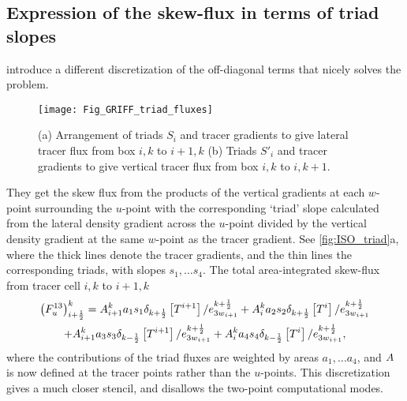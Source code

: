 \documentclass[../tex_main/NEMO_manual]{subfiles}
\begin{document}
\subsection{Expression of the skew-flux in terms of triad slopes}
\citep{Griffies_al_JPO98} introduce a different discretization of the off-diagonal terms that
nicely solves the problem.
\begin{figure}[tb] \begin{center}
    \texttt{[image: Fig\_GRIFF\_triad\_fluxes]}
    \caption{ \protect\label{fig:ISO_triad}
      (a) Arrangement of triads $S_i$ and tracer gradients to
           give lateral tracer flux from box $i,k$ to $i+1,k$
      (b) Triads $S'_i$ and tracer gradients to give vertical tracer flux from
            box $i,k$ to $i,k+1$.}
 \end{center} \end{figure}
They get the skew flux from the products of the vertical gradients at each $w$-point surrounding the $u$-point with
the corresponding `triad' slope calculated from the lateral density gradient across the $u$-point divided by
the vertical density gradient at the same $w$-point as the tracer gradient.
See \autoref{fig:ISO_triad}a, where the thick lines denote the tracer gradients,
and the thin lines the corresponding triads, with slopes $s_1, \dotsc s_4$.
The total area-integrated skew-flux from tracer cell $i,k$ to $i+1,k$
\begin{multline}
  \label{eq:i13}
  \left( F_u^{13}  \right)_{i+\frac{1}{2}}^k = {A}_{i+1}^k a_1 s_1
  \delta_{k+\frac{1}{2}} \left[ T^{i+1}
  \right]/e_{{3w}_{i+1}}^{k+\frac{1}{2}}  + {A} _i^k a_2 s_2 \delta
  _{k+\frac{1}{2}} \left[ T^i
  \right]/e_{{3w}_{i+1}}^{k+\frac{1}{2}} \\
   +{A} _{i+1}^k a_3 s_3 \delta_{k-\frac{1}{2}} \left[ T^{i+1}
  \right]/e_{{3w}_{i+1}}^{k+\frac{1}{2}}  +{A} _i^k a_4 s_4 \delta
  _{k-\frac{1}{2}} \left[ T^i \right]/e_{{3w}_{i+1}}^{k+\frac{1}{2}},
\end{multline}
where the contributions of the triad fluxes are weighted by areas $a_1, \dotsc a_4$,
and ${A}$ is now defined at the tracer points rather than the $u$-points.
This discretization gives a much closer stencil, and disallows the two-point computational modes.
\end{document}
